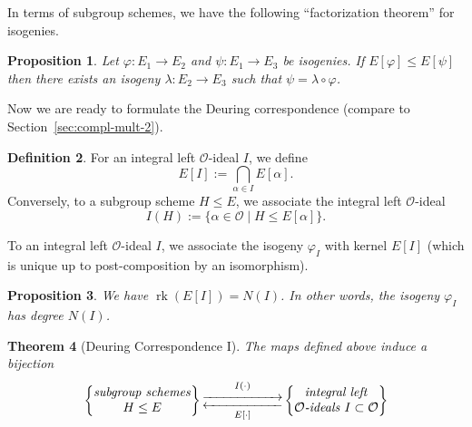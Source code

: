 \documentclass[10pt]{article}
\theoremstyle{plain}
\newtheorem{theorem}{Theorem}
\newtheorem{proposition}[theorem]{Proposition}
\theoremstyle{definition}
\newtheorem{definition}[theorem]{Definition}
\DeclareMathOperator{\rk}{rk} %
\def\O{\ensuremath{\mathcal{O}}}
\begin{document}
In terms of subgroup schemes, we have the following ``factorization theorem''
for isogenies.

\begin{proposition}
Let $\varphi:E_1\to E_2$ and $\psi:E_1\to E_3$ be isogenies.
If $E[\varphi]\leq E[\psi]$ then there exists an isogeny
$\lambda:E_2\to E_3$ such that $\psi = \lambda\circ\varphi$.
\end{proposition}

Now we are ready to formulate the Deuring correspondence (compare to
Section~\ref{sec:compl-mult-2}).

\begin{definition}
For an integral left $\O$-ideal $I$, we define
\begin{equation*}
    E[I] := \bigcap_{\alpha\in I} E[\alpha].
\end{equation*}
Conversely, to a subgroup scheme $H\leq E$,
we associate the integral left $\O$-ideal 
\begin{equation*}
    I(H) := \{\alpha\in\O\mid H\leq E[\alpha]\}.
\end{equation*}
\end{definition}

To an integral left $\O$-ideal $I$, we associate the isogeny $\varphi_I$
with kernel $E[I]$ (which is unique up to post-composition by an
isomorphism).

\begin{proposition}
We have $\rk(E[I]) = N(I)$. In other words,
the isogeny $\varphi_I$ has degree $N(I)$.
\end{proposition}

\begin{theorem}[Deuring Correspondence I]\label{thm:deuring1}
    The maps defined above induce a bijection
    \begin{equation*}
        \left\{
            \begin{tabular}{@{} c @{}}
                \emph{subgroup schemes} \\
                $H\leq E$
            \end{tabular}
        \right\}
        \begin{gathered}
            \overset{I(\cdot)}{\xrightarrow{\hspace*{2cm}}} \\[-2ex]
            \underset{E[\cdot]}{\xleftarrow{\hspace*{2cm}}}
        \end{gathered}
        \left\{
            \begin{tabular}{@{} c @{}}
                \emph{integral left} \\
                $\O$\emph{-ideals} $I\subset \O$
            \end{tabular}
        \right\}
    \end{equation*}
\end{theorem}
\end{document}
